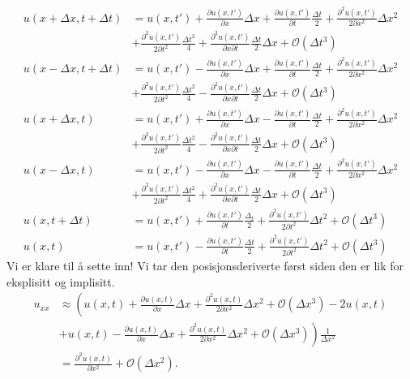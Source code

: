 \documentclass[norsk, 10pt]{article}
\begin{document}
\begin{align}
u(x+\Delta x, t+\Delta t)&=u(x,t')+\frac{\partial u(x,t')}{\partial x}\Delta x+\frac{\partial u(x,t')}{\partial t} \frac{\Delta t}{2} +\frac{\partial^2 u(x,t')}{2\partial x^2}\Delta x^2\nonumber \\ 
&+\frac{\partial^2 u(x,t')}{2\partial t^2}\frac{\Delta t^2}{4} +\frac{\partial^2 u(x,t')}{\partial x\partial t}\frac{\Delta t}{2} \Delta x+ \mathcal{O}(\Delta t^3) \label{eq:deltaxdeltatpluss} \\
%
u(x-\Delta x, t+\Delta t)&=u(x,t')-\frac{\partial u(x,t')}{\partial x}\Delta x+\frac{\partial u(x,t')}{\partial t} \frac{\Delta t}{2} +\frac{\partial^2 u(x,t')}{2\partial x^2}\Delta x^2\\  \nonumber
&+\frac{\partial^2 u(x,t')}{2\partial t^2}\frac{\Delta t^2}{4} -\frac{\partial^2 u(x,t')}{\partial x\partial t}\frac{\Delta t}{2} \Delta x+ \mathcal{O}(\Delta t^3) \label{eq:deltaxmindeltatpluss} \\
%
u(x+\Delta x,t)&=u(x,t')+\frac{\partial u(x,t')}{\partial x}\Delta x-\frac{\partial u(x,t')}{\partial t} \frac{\Delta t}{2} +\frac{\partial^2 u(x,t')}{2\partial x^2}\Delta x^2\\  \nonumber
&+\frac{\partial^2 u(x,t')}{2\partial t^2}\frac{\Delta t^2}{4} -\frac{\partial^2 u(x,t')}{\partial x\partial t}\frac{\Delta t}{2} \Delta x+ \mathcal{O}(\Delta t^3) \label{eq:deltaxplussCN}\\ 
%
u(x-\Delta x,t)&=u(x,t')-\frac{\partial u(x,t')}{\partial x}\Delta x-\frac{\partial u(x,t')}{\partial t} \frac{\Delta t}{2} +\frac{\partial^2 u(x,t')}{2\partial x^2}\Delta x^2 \\  \nonumber
&+\frac{\partial^2 u(x,t')}{2\partial t^2}\frac{\Delta t^2}{4} +\frac{\partial^2 u(x,t')}{\partial x\partial t}\frac{\Delta t}{2} \Delta x+ \mathcal{O}(\Delta t^3) \label{eq:deltaxminCN} \\
%
u(x,t+\Delta t)&=u(x,t')+\frac{\partial u(x,t')}{\partial t}\frac{\Delta_t}{2} +\frac{\partial ^2 u(x,t')}{2\partial t^2}\Delta t^2 + \mathcal{O}(\Delta t^3) \label{eq:deltatplussCN}\\
%
u(x,t)&=u(x,t')-\frac{\partial u(x,t')}{\partial t}\frac{\Delta t}{2}+\frac{\partial ^2 u(x,t')}{2\partial t^2}\Delta t^2 + \mathcal{O}(\Delta t^3) \label{eq:uxtCN}
\end{align}
Vi er klare til å sette inn! Vi tar den posisjonsderiverte først siden den er lik for eksplisitt og implisitt.
\begin{align}
u_{xx} &\approx \left(u(x,t)+\frac{\partial u(x,t)}{\partial x} \Delta x+\frac{\partial^2 u(x,t)}{2\partial x^2}\Delta x^2+\mathcal{O}(\Delta x^3) - 2 u(x,t)\right. \nonumber\\
& \left.+ u(x,t)-\frac{\partial u(x,t)}{\partial x}\Delta x+\frac{\partial^2 u(x,t)}{2\partial x^2} \Delta x^2+\mathcal{O}(\Delta x^3)\right)\frac{1}{\Delta x^2}\nonumber \\
&=\frac{\partial^2 u(x,t)}{\partial x^2} +\mathcal{O}(\Delta x^2). \label{eq:trunkxx}
\end{align}
\end{document}
